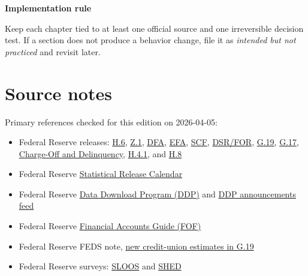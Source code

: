 \documentclass[11pt,openany]{book}
\begin{document}
\begin{signalbox}
\textbf{Implementation rule}\par
Keep each chapter tied to at least one official source and one irreversible decision test. If a section does not produce a behavior change, file it as \textit{intended but not practiced} and revisit later.
\end{signalbox}

\chapter{Source notes}

Primary references checked for this edition on 2026-04-05:

\begin{itemize}
  \item Federal Reserve releases: \href{https://www.federalreserve.gov/releases/h6/current/default.htm}{H.6}, \href{https://www.federalreserve.gov/releases/z1/}{Z.1}, \href{https://www.federalreserve.gov/releases/z1/dataviz/dfa/index.html}{DFA}, \href{https://www.federalreserve.gov/releases/efa/enhanced-financial-accounts.htm}{EFA}, \href{https://www.federalreserve.gov/econres/scfindex.htm}{SCF}, \href{https://www.federalreserve.gov/releases/dsr/}{DSR/FOR}, \href{https://www.federalreserve.gov/releases/g19/}{G.19}, \href{https://www.federalreserve.gov/releases/g17/}{G.17}, \href{https://www.federalreserve.gov/releases/chargeoff/}{Charge-Off and Delinquency}, \href{https://www.federalreserve.gov/releases/h41/}{H.4.1}, and \href{https://www.federalreserve.gov/releases/h8/}{H.8}
  \item Federal Reserve \href{https://www.federalreserve.gov/data/releaseschedule.htm}{Statistical Release Calendar}
  \item Federal Reserve \href{https://www.federalreserve.gov/datadownload/default.htm}{Data Download Program (DDP)} and \href{https://www.federalreserve.gov/feeds/DataDownload.html}{DDP announcements feed}
  \item Federal Reserve \href{https://www.federalreserve.gov/apps/fof/}{Financial Accounts Guide (FOF)}
  \item Federal Reserve FEDS note, \href{https://www.federalreserve.gov/econres/notes/feds-notes/a-note-on-the-new-credit-union-estimates-in-the-g-19-consumer-credit-statistical-release-20250708.html}{new credit-union estimates in G.19}
  \item Federal Reserve surveys: \href{https://www.federalreserve.gov/data/sloos.htm}{SLOOS} and \href{https://www.federalreserve.gov/publications/report-economic-well-being-us-households.htm}{SHED}

\end{itemize}
\end{document}
